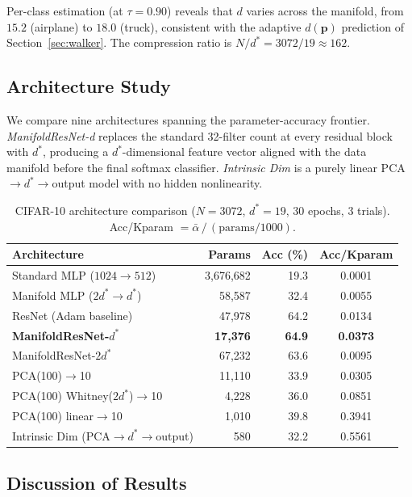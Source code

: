 \documentclass[11pt,letterpaper]{article}
\newcommand{\pos}{\mathbf{p}}
\begin{document}
Per-class estimation (at $\tau = 0.90$) reveals that $d$ varies across
the manifold, from $15.2$ (airplane) to $18.0$ (truck), consistent with
the adaptive $d(\pos)$ prediction of Section~\ref{sec:walker}.  The
compression ratio is $N/d^* = 3072/19 \approx 162$.

\subsection{Architecture Study}

We compare nine architectures spanning the parameter-accuracy frontier.
\emph{ManifoldResNet-d} replaces the standard 32-filter count at every
residual block with $d^*$, producing a $d^*$-dimensional feature vector
aligned with the data manifold before the final softmax classifier.
\emph{Intrinsic Dim} is a purely linear PCA$\to d^*\to$output model
with no hidden nonlinearity.

\begin{table}[h]
\centering
\caption{CIFAR-10 architecture comparison ($N=3072$, $d^*=19$, 30 epochs,
  3 trials). Acc/Kparam $= \bar{\alpha} \,/\, (\text{params}/1000)$.}
\label{tab:cifar10_arch}
\begin{tabular}{@{}lrrc@{}}
\toprule
\textbf{Architecture} & \textbf{Params} & \textbf{Acc (\%)} & \textbf{Acc/Kparam} \\
\midrule
Standard MLP ($1024\to512$) & 3{,}676{,}682 & 19.3 & 0.0001 \\
Manifold MLP ($2d^*\to d^*$) & 58{,}587 & 32.4 & 0.0055 \\
ResNet (Adam baseline) & 47{,}978 & 64.2 & 0.0134 \\
\textbf{ManifoldResNet-}$d^*$ & \textbf{17{,}376} & \textbf{64.9} & \textbf{0.0373} \\
ManifoldResNet-$2d^*$ & 67{,}232 & 63.6 & 0.0095 \\
PCA(100)$\to$10 & 11{,}110 & 33.9 & 0.0305 \\
PCA(100) Whitney($2d^*$)$\to$10 & 4{,}228 & 36.0 & 0.0851 \\
PCA(100) linear$\to$10 & 1{,}010 & 39.8 & 0.3941 \\
Intrinsic Dim (PCA$\to d^*\to$output) & 580 & 32.2 & 0.5561 \\
\bottomrule
\end{tabular}
\end{table}

\subsection{Discussion of Results}
\end{document}
